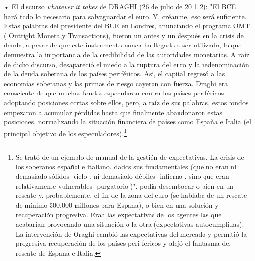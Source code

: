 \documentclass[10pt,a4paper]{article}
\begin{document}
• El discurso \textit{whatever it takes} de DRAGHI (26 de julio de 20 1 2): "El BCE hará todo lo necesario para salvaguardar el euro. Y, créanme, eso será suficiente. Estas palabras del presidente del BCE en Londres, anunciando el programa OMT ( Outright Moneta,y Transactions), fueron un antes y un después en la crisis de deuda, a pesar de que este instrumento nunca ha llegado a ser utilizado, lo que demuestra la importancia de la credibilidad de las autoridades monetarias. A raíz de dicho discurso, desapareció el miedo a la ruptura del euro y la redenominación de la deuda soberana de los países periféricos. Así, el capital regresó a las economías soberanas y las primas de riesgo cayeron con fuerza. Draghi era consciente de que muchos fondos especularon contra los países periféricos adoptando posiciones cortas sobre ellos, pero, a raíz de sus palabras, estos fondos empezaron a acumular pérdidas hasta que finalmente abandonaron estas posiciones, normalizando la situación financiera de países como España e Italia (el principal objetivo de los especuladores).\footnote{%
    Se trató de un ejemplo de manual de la gestión de expectativas. La crisis de los soberanos español e italiano. dados sus fundamentales (que no eran ni demasiado sólidos -cielo-. ni demasiado débiles -infierno-. sino que eran relativamente vulnerables -purgatorio-)". podía desembocar o bíen en un rescate y. probablemente. el fin de la zona del euro (se hablaba de un rescate de mínimo 500.000 millones para Espana), o bien en una solución y recuperación progresiva. Eran las expectativas de los agentes las que acabarían provocando una situación o la otra (expectativas autocumplidas). La intervención de Oraghi cambió las expectativas del mercado y permitió la progresiva recuperación de los países peri fericos y alejó el fantasma del rescate de Espana e Italia.
}
\end{document}
